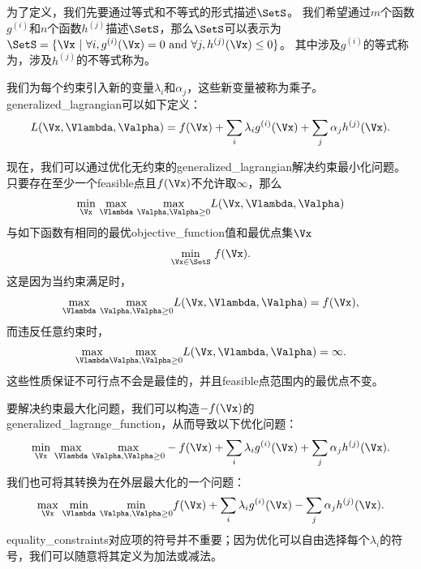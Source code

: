 为了定义，我们先要通过等式和不等式的形式描述$\SetS$。 
我们希望通过$m$个函数$g^{(i)}$和$n$个函数$h^{(j)}$描述$\SetS$，那么$\SetS$可以表示为$\SetS = \{ \Vx ~|~ \forall i, g^{(i)}(\Vx) = 0 ~\text{and}~ \forall j, h^{(j)}(\Vx) \leq 0  \}$。
其中涉及$g^{(i)}$的等式称为，涉及$h^{(j)}$的不等式称为。

我们为每个约束引入新的变量$\lambda_i$和$\alpha_j$，这些新变量被称为乘子。\gls{generalized_lagrangian}可以如下定义：
\begin{align}
 L(\Vx, \Vlambda, \Valpha) = f(\Vx) + \sum_i \lambda_i g^{(i)}(\Vx)  + \sum_j \alpha_j h^{(j)}(\Vx).
\end{align}

现在，我们可以通过优化无约束的\gls{generalized_lagrangian}解决约束最小化问题。
只要存在至少一个\gls{feasible}点且$f(\Vx)$不允许取$\infty$，那么
\begin{align}
 \underset{\Vx}{\min}~  \underset{\Vlambda}{\max}~
 \underset{\Valpha, \Valpha \geq 0}{\max}   L(\Vx, \Vlambda, \Valpha) 
\end{align}
与如下函数有相同的最优\gls{objective_function}值和最优点集$\Vx$
\begin{align}
 \underset{\Vx \in \SetS}{\min}~ f(\Vx).
\end{align}
这是因为当约束满足时，
\begin{align}
  \underset{\Vlambda}{\max}~
 \underset{\Valpha, \Valpha \geq 0}{\max}   L(\Vx, \Vlambda, \Valpha)  = f(\Vx) ,
\end{align}
而违反任意约束时，
\begin{align}
  \underset{\Vlambda}{\max}  
 \underset{\Valpha, \Valpha \geq 0}{\max}   L(\Vx, \Vlambda, \Valpha)  = \infty .
\end{align}
这些性质保证不可行点不会是最佳的，并且\gls{feasible}点范围内的最优点不变。


要解决约束最大化问题，我们可以构造$-f(\Vx)$的\gls{generalized_lagrange_function}，从而导致以下优化问题：
\begin{align}
 \underset{\Vx}{\min}~ \underset{\Vlambda}{\max}  ~
 \underset{\Valpha, \Valpha \geq 0}{\max} 
  -f(\Vx) + \sum_i \lambda_i g^{(i)}(\Vx)  + \sum_j \alpha_j h^{(j)}(\Vx).
\end{align}
我们也可将其转换为在外层最大化的一个问题：
\begin{align}
 \underset{\Vx}{\max}~ \underset{\Vlambda}{\min}~
 \underset{\Valpha, \Valpha \geq 0}{\min} 
  f(\Vx) + \sum_i \lambda_i g^{(i)}(\Vx) - \sum_j \alpha_j h^{(j)}(\Vx).
\end{align}
\gls{equality_constraints}对应项的符号并不重要；因为优化可以自由选择每个$\lambda_i$的符号，我们可以随意将其定义为加法或减法。

